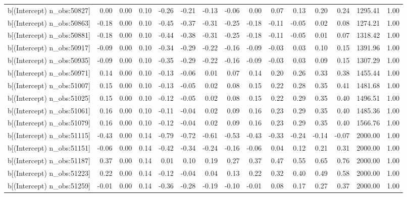 \begin{table}[ht]
\begin{tabular}{rrrrrrrrrrrrrrr}
  b[(Intercept) n\_obs:50827] & 0.00 & 0.00 & 0.10 & -0.26 & -0.21 & -0.13 & -0.06 & 0.00 & 0.07 & 0.13 & 0.20 & 0.24 & 1295.41 & 1.00 \\ 
  b[(Intercept) n\_obs:50863] & -0.18 & 0.00 & 0.10 & -0.45 & -0.37 & -0.31 & -0.25 & -0.18 & -0.11 & -0.05 & 0.02 & 0.08 & 1274.21 & 1.00 \\ 
  b[(Intercept) n\_obs:50881] & -0.18 & 0.00 & 0.10 & -0.44 & -0.38 & -0.31 & -0.25 & -0.18 & -0.11 & -0.05 & 0.01 & 0.07 & 1318.42 & 1.00 \\ 
  b[(Intercept) n\_obs:50917] & -0.09 & 0.00 & 0.10 & -0.34 & -0.29 & -0.22 & -0.16 & -0.09 & -0.03 & 0.03 & 0.10 & 0.15 & 1391.96 & 1.00 \\ 
  b[(Intercept) n\_obs:50935] & -0.09 & 0.00 & 0.10 & -0.35 & -0.29 & -0.22 & -0.16 & -0.09 & -0.03 & 0.03 & 0.09 & 0.15 & 1307.29 & 1.00 \\ 
  b[(Intercept) n\_obs:50971] & 0.14 & 0.00 & 0.10 & -0.13 & -0.06 & 0.01 & 0.07 & 0.14 & 0.20 & 0.26 & 0.33 & 0.38 & 1455.44 & 1.00 \\ 
  b[(Intercept) n\_obs:51007] & 0.15 & 0.00 & 0.10 & -0.13 & -0.05 & 0.02 & 0.08 & 0.15 & 0.22 & 0.28 & 0.35 & 0.41 & 1481.68 & 1.00 \\ 
  b[(Intercept) n\_obs:51025] & 0.15 & 0.00 & 0.10 & -0.12 & -0.05 & 0.02 & 0.08 & 0.15 & 0.22 & 0.29 & 0.35 & 0.40 & 1496.51 & 1.00 \\ 
  b[(Intercept) n\_obs:51061] & 0.16 & 0.00 & 0.10 & -0.11 & -0.04 & 0.02 & 0.09 & 0.16 & 0.23 & 0.29 & 0.35 & 0.40 & 1485.36 & 1.00 \\ 
  b[(Intercept) n\_obs:51079] & 0.16 & 0.00 & 0.10 & -0.12 & -0.04 & 0.02 & 0.09 & 0.16 & 0.23 & 0.29 & 0.35 & 0.40 & 1566.76 & 1.00 \\ 
  b[(Intercept) n\_obs:51115] & -0.43 & 0.00 & 0.14 & -0.79 & -0.72 & -0.61 & -0.53 & -0.43 & -0.33 & -0.24 & -0.14 & -0.07 & 2000.00 & 1.00 \\ 
  b[(Intercept) n\_obs:51151] & -0.06 & 0.00 & 0.14 & -0.42 & -0.34 & -0.24 & -0.16 & -0.06 & 0.04 & 0.12 & 0.21 & 0.31 & 2000.00 & 1.00 \\ 
  b[(Intercept) n\_obs:51187] & 0.37 & 0.00 & 0.14 & 0.01 & 0.10 & 0.19 & 0.27 & 0.37 & 0.47 & 0.55 & 0.65 & 0.76 & 2000.00 & 1.00 \\ 
  b[(Intercept) n\_obs:51223] & 0.22 & 0.00 & 0.14 & -0.12 & -0.04 & 0.04 & 0.13 & 0.22 & 0.32 & 0.40 & 0.49 & 0.58 & 2000.00 & 1.00 \\ 
  b[(Intercept) n\_obs:51259] & -0.01 & 0.00 & 0.14 & -0.36 & -0.28 & -0.19 & -0.10 & -0.01 & 0.08 & 0.17 & 0.27 & 0.37 & 2000.00 & 1.00 \\ 

\end{tabular}
\end{table}
